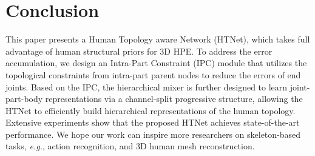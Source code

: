 \documentclass{article}
\def\VspacePa{\vspace{-0.30cm}}
\def\VspacePb{\vspace{-0.20cm}}
\begin{document}
\VspacePa
\section{Conclusion}
\VspacePb
\label{Conclusion}
This paper presents a Human Topology aware Network (HTNet), which takes full advantage of human structural priors for 3D HPE. 
To address the error accumulation, we design an Intra-Part Constraint (IPC) module that utilizes the topological constraints from intra-part parent nodes to reduce the errors of end joints.
Based on the IPC, the hierarchical mixer is further designed to learn joint-part-body representations via a channel-split progressive structure, allowing the HTNet to efficiently build hierarchical representations of the human topology.
Extensive experiments show that the proposed HTNet achieves state-of-the-art performance. 
We hope our work can inspire more researchers on skeleton-based tasks, \textit{e.g.}, action recognition, and 3D human mesh reconstruction. 


{\small



}
\end{document}
